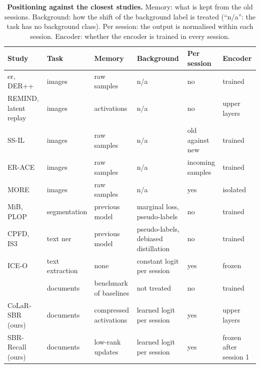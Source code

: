 \begin{table}[!htbp]
  \centering
  \caption[Positioning against the closest studies]{\textbf{Positioning against the closest
  studies.} Memory: what is kept from the old sessions. Background: how the shift of the
  background label is treated (``n/a'': the task has no background class). Per session:
  the output is normalised within each session. Encoder: whether the encoder is trained in
  every session.}
  \label{tab:positioning}
  \footnotesize\setlength{\tabcolsep}{4pt}
  \begin{tabularx}{\textwidth}{@{}>{\raggedright\arraybackslash}p{2.7cm} >{\raggedright\arraybackslash}p{1.8cm} >{\raggedright\arraybackslash}p{2.1cm} >{\raggedright\arraybackslash}X >{\raggedright\arraybackslash}p{1.7cm} >{\raggedright\arraybackslash}p{1.7cm}@{}}
    \toprule
    Study & Task & Memory & Background & Per session & Encoder \\
    \midrule
    \gls{er}, DER++ & images & raw samples & n/a & no & trained \\
    REMIND, latent replay & images & activations & n/a & no & upper layers \\
    SS-IL & images & raw samples & n/a & old against new & trained \\
    ER-ACE & images & raw samples & n/a & incoming samples & trained \\
    MORE & images & raw samples & n/a & yes & isolated \\
    MiB, PLOP & segmentation & previous model & marginal loss, pseudo-labels & no &
      trained \\
    CPFD, IS3 & text \gls{ner} & previous model & pseudo-labels, debiased distillation &
      no & trained \\
    ICE-O & text extraction & none & constant logit per session & yes & frozen \\
    \citet{sassioui2026documents} & documents & benchmark of baselines & not treated & no
      & trained \\
    \midrule
    CoLaR-SBR (ours) & documents & compressed activations & learned logit per session &
      yes & upper layers \\
    SBR-Recall (ours) & documents & low-rank updates & learned logit per session & yes &
      frozen after session 1 \\
    \bottomrule
  \end{tabularx}
\end{table}

